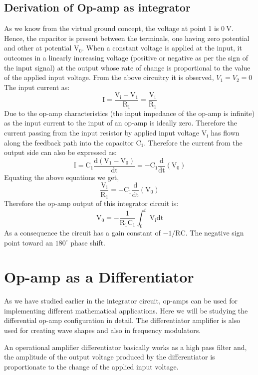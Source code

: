 \subsection{Derivation of Op-amp as integrator}


As we know from the virtual ground concept, the voltage at point 1 is $0 \mathrm{~V}$. Hence, the capacitor is present between the terminals, one having zero potential and other at potential $\mathrm{V}_{0}$. When a constant voltage is applied at the input, it outcomes in a linearly increasing voltage (positive or negative as per the sign of the input signal) at the output whose rate of change is proportional to the value of the applied input voltage.
From the above circuitry it is observed, $V_{1}=V_{2}=0$
The input current as:
$$
\mathrm{I}=\frac{\mathrm{V}_{\mathrm{i}}-\mathrm{V}_{1}}{\mathrm{R}_{1}}=\frac{\mathrm{V}_{\mathrm{i}}}{\mathrm{R}_{1}}
$$
Due to the op-amp characteristics (the input impedance of the op-amp is infinite) as the input current to the input of an op-amp is ideally zero. Therefore the current passing from the input resistor by applied input voltage $\mathrm{V}_{\mathrm{i}}$ has flown along the feedback path into the capacitor $\mathrm{C}_{1}$.
Therefore the current from the output side can also be expressed as:
$$
\mathrm{I}=\mathrm{C}_{1} \frac{\mathrm{d}\left(\mathrm{V}_{1}-\mathrm{V}_{0}\right)}{\mathrm{dt}}=-\mathrm{C}_{1} \frac{\mathrm{d}}{\mathrm{dt}}\left(\mathrm{V}_{0}\right)
$$
Equating the above equations we get,
$$
\frac{\mathrm{V}_{\mathrm{i}}}{\mathrm{R}_{1}}=-\mathrm{C}_{1} \frac{\mathrm{d}}{\mathrm{dt}}\left(\mathrm{V}_{0}\right)
$$
Therefore the op-amp output of this integrator circuit is:
$$
\mathrm{V}_{0}=-\frac{1}{\mathrm{R}_{1} \mathrm{C}_{1}} \int_{0}^{t} \mathrm{~V}_{\mathrm{i}} \mathrm{dt}
$$
As a consequence the circuit has a gain constant of $-1 / \mathrm{RC}$. The negative sign point toward an $180^{\circ}$ phase shift.

\section{Op-amp as a Differentiator}
As we have studied earlier in the integrator circuit, op-amps can be used for implementing different mathematical applications. Here we will be studying the differential op-amp configuration in detail. The differentiator amplifier is also used for creating wave shapes and also in frequency modulators.

An operational amplifier differentiator basically works as a high pass filter and, the amplitude of the output voltage produced by the differentiator is proportionate to the change of the applied input voltage.

